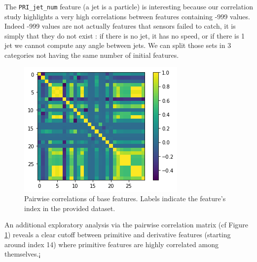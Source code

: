 \documentclass[10pt,conference,compsocconf]{IEEEtran}
\begin{document}

The \verb+PRI_jet_num+ feature (a jet is a particle) is interesting because our correlation study highlights a very high correlations between features containing -999 values. Indeed -999 values are not actually features that sensors failed to catch, it is simply that they do not exist : if there is no jet, it has no speed, or if there is 1 jet we cannot compute any angle between jets. We can split those sets in 3 categories not having the same number of initial features.\\

\begin{figure}[H]
\centering
\includegraphics[width=\linewidth]{corr.png}

\cprotect\caption{Pairwise correlations of base features. Labels indicate the feature's index in the provided dataset. }
\label{fig_corr}
\end{figure}

An additional exploratory analysis via the pairwise correlation matrix (cf Figure \ref{fig_corr}) reveals a clear cutoff between primitive and derivative features (starting around index 14) where  primitive features are highly correlated among themselves.¡
\end{document}
